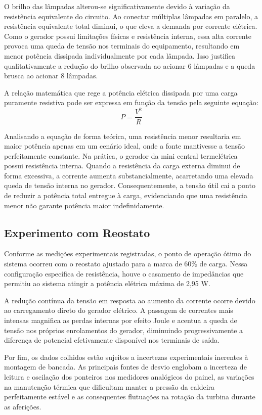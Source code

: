 \documentclass[12pt,a4paper]{article}
\begin{document}
O brilho das lâmpadas alterou-se significativamente devido à variação da resistência equivalente do circuito. Ao conectar múltiplas lâmpadas em paralelo, a resistência equivalente total diminui, o que eleva a demanda por corrente elétrica. Como o gerador possui limitações físicas e resistência interna, essa alta corrente provoca uma queda de tensão nos terminais do equipamento, resultando em menor potência dissipada individualmente por cada lâmpada. Isso justifica qualitativamente a redução do brilho observada ao acionar 6 lâmpadas e a queda brusca ao acionar 8 lâmpadas.

A relação matemática que rege a potência elétrica dissipada por uma carga puramente resistiva pode ser expressa em função da tensão pela seguinte equação:
\begin{equation}
    P = \frac{V^2}{R}
\end{equation}

Analisando a equação de forma teórica, uma resistência menor resultaria em maior potência apenas em um cenário ideal, onde a fonte mantivesse a tensão perfeitamente constante. Na prática, o gerador da mini central termelétrica possui resistência interna. Quando a resistência da carga externa diminui de forma excessiva, a corrente aumenta substancialmente, acarretando uma elevada queda de tensão interna no gerador. Consequentemente, a tensão útil cai a ponto de reduzir a potência total entregue à carga, evidenciando que uma resistência menor não garante potência maior indefinidamente.

\subsection{Experimento com Reostato}

Conforme as medições experimentais registradas, o ponto de operação ótimo do sistema ocorreu com o reostato ajustado para a marca de 60\% de carga. Nessa configuração específica de resistência, houve o casamento de impedâncias que permitiu ao sistema atingir a potência elétrica máxima de 2,95 W.

A redução contínua da tensão em resposta ao aumento da corrente ocorre devido ao carregamento direto do gerador elétrico. A passagem de correntes mais intensas magnifica as perdas internas por efeito Joule e acentua a queda de tensão nos próprios enrolamentos do gerador, diminuindo progressivamente a diferença de potencial efetivamente disponível nos terminais de saída.

Por fim, os dados colhidos estão sujeitos a incertezas experimentais inerentes à montagem de bancada. As principais fontes de desvio englobam a incerteza de leitura e oscilação dos ponteiros nos medidores analógicos do painel, as variações na manutenção térmica que dificultam manter a pressão da caldeira perfeitamente estável e as consequentes flutuações na rotação da turbina durante as aferições.
\end{document}
